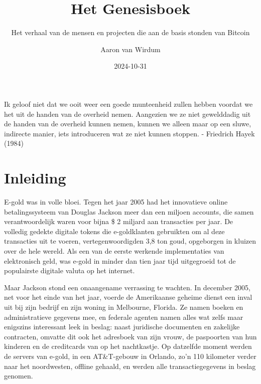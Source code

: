 \documentclass[
  a5paper,
  smalldemyvopaper,11pt,twoside,onecolumn,openright,extrafontsizes,
hidelinks]{memoir}
\title{Het Genesisboek}
\subtitle{Het verhaal van de mensen en projecten die aan de basis
stonden van Bitcoin}
\author{Aaron van Wirdum}
\date{2024-10-31}
\renewenvironment{quote}%
               {\list{}{\rightmargin=.3cm\leftmargin=.3cm}%
                \itshape \item[]}%
               {\endlist}
\renewcommand*\contentsname{Inhoudsopgave}
\newcommand\contentsname{Inhoudsopgave}
\begin{document}
\frontmatter
\maketitle

\renewcommand*\contentsname{Inhoudsopgave}
{
\pagestyle{empty}
\setcounter{tocdepth}{0}
\tableofcontents*
}
\pagestyle{mystyle}



\newpage
\pagestyle{empty}

\vspace*{\fill}
\begin{quote}
Ik geloof niet dat we ooit weer een goede munteenheid zullen hebben
voordat we het uit de handen van de overheid nemen. Aangezien we ze niet
gewelddadig uit de handen van de overheid kunnen nemen, kunnen we alleen
maar op een sluwe, indirecte manier, iets introduceren wat ze niet
kunnen stoppen. - Friedrich Hayek (1984)
\end{quote}
\vspace*{\fill}
\newpage
\pagestyle{mystyle}


\chapter*{Inleiding}\label{inleiding}


E-gold was in volle bloei. Tegen het jaar 2005 had het innovatieve
online betalingssysteem van Douglas Jackson meer dan een miljoen
accounts, die samen verantwoordelijk waren voor bijna \$ 2 miljard aan
transacties per jaar. De volledig gedekte digitale tokens die
e-goldklanten gebruikten om al deze transacties uit te voeren,
vertegenwoordigden 3,8 ton goud, opgeborgen in kluizen over de hele
wereld. Als een van de eerste werkende implementaties van elektronisch
geld, was e-gold in minder dan tien jaar tijd uitgegroeid tot de
populairste digitale valuta op het internet.

Maar Jackson stond een onaangename verrassing te wachten. In december
2005, net voor het einde van het jaar, voerde de Amerikaanse geheime
dienst een inval uit bij zijn bedrijf en zijn woning in Melbourne,
Florida. Ze namen boeken en administratieve gegevens mee, en federale
agenten namen alles wat zelfs maar enigszins interessant leek in beslag:
naast juridische documenten en zakelijke contracten, omvatte dit ook het
adresboek van zijn vrouw, de paspoorten van hun kinderen en de
creditcards van op het nachtkastje. Op datzelfde moment werden de
servers van e-gold, in een AT\&T-gebouw in Orlando, zo'n 110 kilometer
verder naar het noordwesten, offline gehaald, en werden alle
transactiegegevens in beslag genomen.
\end{document}
